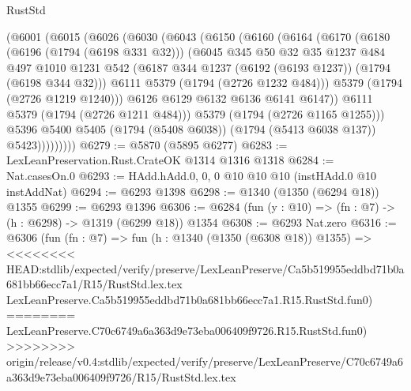 \begin{lexlean}{RustStd}
\begin{coremodule}
{\begin{coremodule}
{{{{{{{{{{{{{{            (@6001
              (@6015
                (@6026
                  (@6030
                    (@6043
                      (@6150
                        (@6160
                          (@6164
                            (@6170
                              (@6180
                                (@6196 (@1794 (@6198 @331 @32)))
                                (@6045
                                  @345
                                  @50
                                  @32
                                  @35
                                  @1237
                                  @484
                                  @497
                                  @1010
                                  @1231
                                  @542
                                  (@6187 @344 @1237 (@6192 (@6193 @1237)) (@1794 (@6198 @344 @32)))
                                  @6111
                                  @5379
                                  (@1794 (@2726 @1232 @484)))
                                @5379
                                (@1794 (@2726 @1219 @1240)))
                              @6126
                              @6129
                              @6132
                              @6136
                              @6141
                              @6147))
                          @6111
                          @5379
                          (@1794 (@2726 @1211 @484)))
                        @5379
                        (@1794 (@2726 @1165 @1255)))
                      @5396
                      @5400
                      @5405
                      (@1794 (@5408 @6038))
                      (@1794 (@5413 @6038 @137))
                      @5423)))))))))
@6279 := @5870 (@5895 @6277)
@6283 := LexLeanPreservation.Rust.CrateOK @1314 @1316 @1318
@6284 := Nat.casesOn.{0}
@6293 := HAdd.hAdd.{0, 0, 0} @10 @10 @10 (instHAdd.{0} @10 instAddNat)
@6294 := @6293 @1398
@6298 := @1340 (@1350 (@6294 @18)) @1355
@6299 := @6293 @1396
@6306 := @6284 (fun (y : @10) => (fn : @7) -> (h : @6298) -> @1319 (@6299 @18)) @1354
@6308 := @6293 Nat.zero
@6316 := @6306
    (fun (fn : @7) =>
    fun (h : @1340 (@1350 (@6308 @18)) @1355) =>
<<<<<<<< HEAD:stdlib/expected/verify/preserve/LexLeanPreserve/Ca5b519955eddbd71b0a681bb66ecc7a1/R15/RustStd.lex.tex
    LexLeanPreserve.Ca5b519955eddbd71b0a681bb66ecc7a1.R15.RustStd.fun0)
========
    LexLeanPreserve.C70c6749a6a363d9e73eba006409f9726.R15.RustStd.fun0)
>>>>>>>> origin/release/v0.4:stdlib/expected/verify/preserve/LexLeanPreserve/C70c6749a6a363d9e73eba006409f9726/R15/RustStd.lex.tex
}}}}}}}}}}}}}}
\end{coremodule}}
\end{coremodule}
\end{lexlean}
